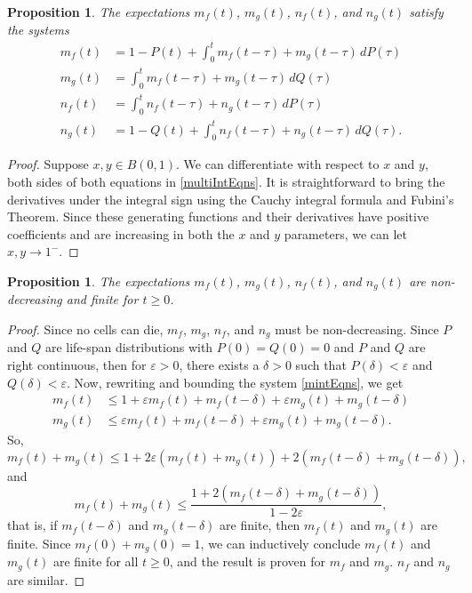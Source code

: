 \documentclass[12pt]{amsart}
\theoremstyle{plain}
\newtheorem{prop}[thm]{Proposition}
\theoremstyle{definition}
\theoremstyle{remark}
\theoremstyle{definition}
\begin{document}
\begin{prop}
The expectations $m_f(t)$, $m_g(t)$, $n_f(t)$, and $n_g(t)$ satisfy the systems
\begin{equation}
\begin{aligned}
\displaystyle m_f(t) &= 1-P(t) + \int_0^t m_f(t-\tau) + m_g(t-\tau) \, dP(\tau) \\
\displaystyle m_g(t) &= \int_0^t m_f(t-\tau) + m_g(t-\tau) \, dQ(\tau) \\
\displaystyle n_f(t) &= \int_0^t n_f(t-\tau) + n_g(t-\tau) \, dP(\tau) \\
\displaystyle n_g(t) &= 1-Q(t) + \int_0^t n_f(t-\tau) + n_g(t-\tau) \, dQ(\tau).
\end{aligned} \label{mintEqns}
\end{equation}
\end{prop}
\begin{proof}
Suppose $x,y \in B(0,1)$. We can differentiate with respect to $x$ and $y$, both sides of both equations in \eqref{multiIntEqns}.  It is straightforward to bring the derivatives under the integral sign using the Cauchy integral formula and Fubini's Theorem.
 Since these generating functions and their derivatives have positive coefficients and are increasing in both the $x$ and $y$ parameters, we can let $x,y \to 1^-$.
\end{proof}

\begin{prop} \label{mnFinite}
The expectations $m_f(t)$, $m_g(t)$, $n_f(t)$, and $n_g(t)$ are non-decreasing and finite for $t \geq 0$.
\end{prop}
\begin{proof}
Since no cells can die, $m_f$, $m_g$, $n_f$, and $n_g$ must be non-decreasing. Since $P$ and $Q$ are life-span distributions with $P(0)=Q(0)=0$ and $P$ and $Q$ are right continuous, then for $\varepsilon > 0$, there exists a $\delta > 0$ such that $P(\delta) < \varepsilon$ and $Q(\delta) < \varepsilon$. Now, rewriting and bounding the system \eqref{mintEqns}, we get
\begin{equation}
\begin{aligned}
m_f(t) &\leq 1 + \varepsilon m_f(t) + m_f(t-\delta) + \varepsilon m_g(t) + m_g(t-\delta) \\
m_g(t) &\leq \varepsilon m_f(t) + m_f(t-\delta) + \varepsilon m_g(t) + m_g(t-\delta).
\end{aligned}
\end{equation}
So,
\begin{equation}
m_f(t)+m_g(t) \leq 1 + 2\varepsilon(m_f(t)+m_g(t))+2(m_f(t-\delta)+m_g(t-\delta)),
\end{equation}
and
\begin{equation}
m_f(t)+m_g(t) \leq \frac{1+2(m_f(t-\delta)+m_g(t-\delta))}{1-2\varepsilon},
\end{equation}
that is, if $m_f(t-\delta)$ and $m_g(t-\delta)$ are finite, then $m_f(t)$ and $m_g(t)$ are finite.  Since $m_f(0)+m_g(0) = 1$, we can inductively conclude $m_f(t)$ and $m_g(t)$ are finite for all $t \geq 0$, and the result is proven for $m_f$ and $m_g$. $n_f$ and $n_g$ are similar.
\end{proof}
\end{document}

